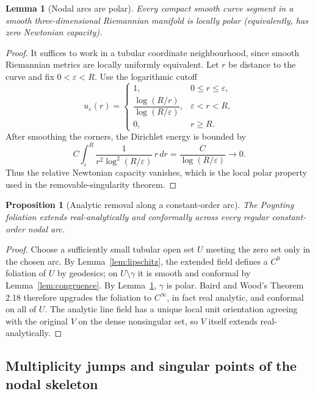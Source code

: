 \documentclass[aps,prd,reprint,nofootinbib,superscriptaddress]{revtex4-2}
\newtheorem{lemma}[theorem]{Lemma}
\newtheorem{proposition}[theorem]{Proposition}
\theoremstyle{definition}
\theoremstyle{remark}
\newcommand{\eps}{\varepsilon}
\begin{document}
\begin{lemma}[Nodal arcs are polar]
\label{lem:polar}
Every compact smooth curve segment in a smooth three-dimensional Riemannian manifold is locally polar (equivalently, has zero Newtonian capacity).
\end{lemma}

\begin{proof}
It suffices to work in a tubular coordinate neighbourhood, since smooth Riemannian metrics are locally uniformly equivalent. Let $r$ be distance to the curve and fix $0<\eps<R$. Use the logarithmic cutoff
\[
u_\eps(r)=\begin{cases}
1,&0\le r\le\eps,\\
\dfrac{\log(R/r)}{\log(R/\eps)},&\eps<r<R,\\
0,&r\ge R.
\end{cases}
\]
After smoothing the corners, the Dirichlet energy is bounded by
\[
C\int_\eps^R\frac{1}{r^2\log^2(R/\eps)}\,r\,dr
=\frac{C}{\log(R/\eps)}\longrightarrow0.
\]
Thus the relative Newtonian capacity vanishes, which is the local polar property used in the removable-singularity theorem.
\end{proof}

\begin{proposition}[Analytic removal along a constant-order arc]
\label{prop:polarremove}
The Poynting foliation extends real-analytically and conformally across every regular constant-order nodal arc.
\end{proposition}

\begin{proof}
Choose a sufficiently small tubular open set $U$ meeting the zero set only in the chosen arc. By Lemma~\ref{lem:lipschitz}, the extended field defines a $C^0$ foliation of $U$ by geodesics; on $U\setminus\gamma$ it is smooth and conformal by Lemma~\ref{lem:congruence}. By Lemma~\ref{lem:polar}, $\gamma$ is polar. Baird and Wood's Theorem 2.18 \cite{BairdWood1991} therefore upgrades the foliation to $C^\infty$, in fact real analytic, and conformal on all of $U$. The analytic line field has a unique local unit orientation agreeing with the original $V$ on the dense nonsingular set, so $V$ itself extends real-analytically.
\end{proof}

\subsection{Multiplicity jumps and singular points of the nodal skeleton}
\end{document}

